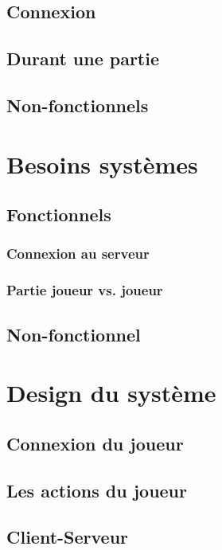 \documentclass[10pt, a4paper]{article}
\begin{document}
		\subsection{Connexion}
		
		\subsection{Durant une partie}
		
		\subsection{Non-fonctionnels}
		
	\section{Besoins systèmes}
		\subsection{Fonctionnels}
		\subsubsection{Connexion au serveur}
		
		\subsubsection{Partie joueur vs. joueur}
		
		\subsection{Non-fonctionnel}
		
	\section{Design du système}
		\subsection{Connexion du joueur}
		
		\subsection{Les actions du joueur}
		
		\subsection{Client-Serveur}
\end{document}
